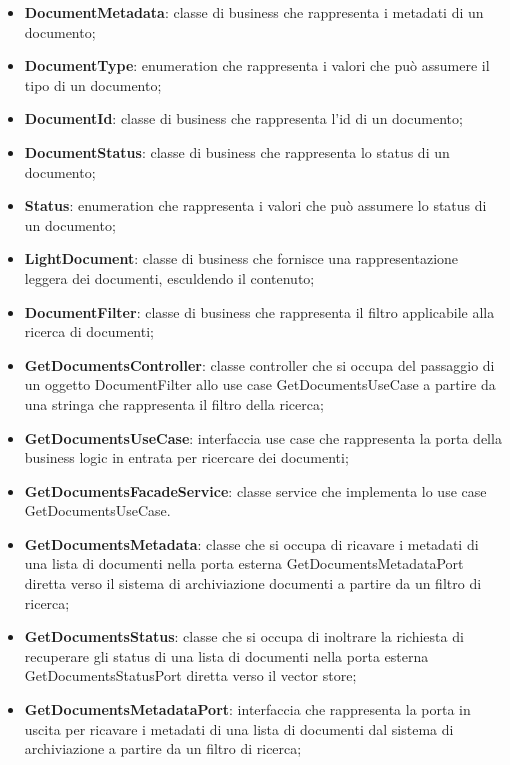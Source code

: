 \documentclass[10pt, a4paper]{article}
\begin{document}
\begin{itemize}
    \item \label{DocumentMetadata}\textbf{DocumentMetadata}: classe di business che rappresenta i metadati di un documento;
    \item \label{DocumentType}\textbf{DocumentType}: enumeration che rappresenta i valori che può assumere il tipo di un documento;
    \item \label{DocumentId}\textbf{DocumentId}: classe di business che rappresenta l'id di un documento;
    \item \label{DocumentStatus}\textbf{DocumentStatus}: classe di business che rappresenta lo status di un documento;
    \item \label{Status}\textbf{Status}: enumeration che rappresenta i valori che può assumere lo status di un documento;
    \item \label{LightDocument}\textbf{LightDocument}: classe di business che fornisce una rappresentazione leggera dei documenti, esculdendo il contenuto;
    \item \label{DocumentFilter}\textbf{DocumentFilter}: classe di business che rappresenta il filtro applicabile alla ricerca di documenti;
    \item \label{GetDocumentsController}\textbf{GetDocumentsController}: classe controller che si occupa del passaggio di un oggetto DocumentFilter allo use case GetDocumentsUseCase a partire da una stringa che rappresenta il filtro della ricerca;
    \item \label{GetDocumentsUseCase}\textbf{GetDocumentsUseCase}: interfaccia use case che rappresenta la porta della business logic in entrata per ricercare dei documenti;
    \item \label{GetDocumentsFacadeService}\textbf{GetDocumentsFacadeService}: classe service che implementa lo use case GetDocumentsUseCase.
    \item \label{GetDocumentsMetadata}\textbf{GetDocumentsMetadata}: classe che si occupa di ricavare i metadati di una lista di documenti nella porta esterna GetDocumentsMetadataPort diretta verso il sistema di archiviazione documenti a partire da un filtro di ricerca;
    \item \label{GetDocumentsStatus}\textbf{GetDocumentsStatus}: classe che si occupa di inoltrare la richiesta di recuperare gli status di una lista di documenti nella porta esterna GetDocumentsStatusPort diretta verso il vector store;
    \item \label{GetDocumentsMetadataPort}\textbf{GetDocumentsMetadataPort}: interfaccia che rappresenta la porta in uscita per ricavare i metadati di una lista di documenti dal sistema di archiviazione a partire da un filtro di ricerca;

\end{itemize}
\end{document}

